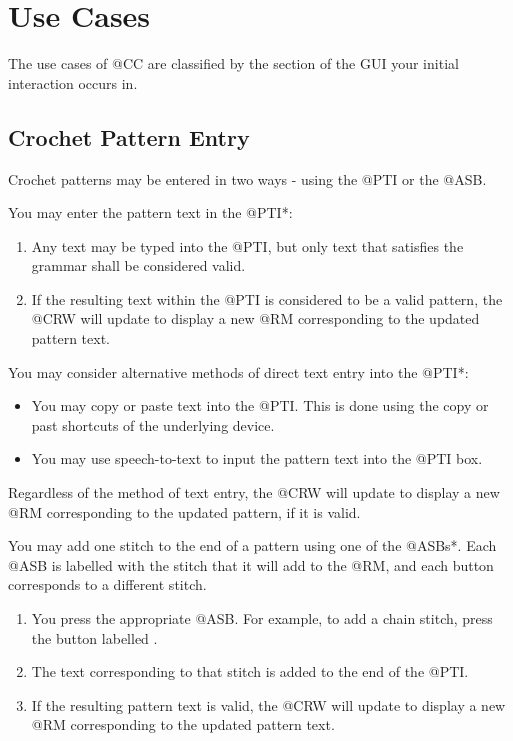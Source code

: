 \documentclass[main.tex]{subfiles}
\begin{document}
\chapter{Use Cases}\label{chp:use}

The use cases of @CC are classified by the section of the GUI your initial interaction occurs in.

\section{Crochet Pattern Entry}

Crochet patterns may be entered in two ways - using the @PTI or the @ASB.

You may enter the pattern text in the @PTI*:
\begin{enumerate}
\item Any text may be typed into the @PTI, but only text that satisfies the grammar shall be considered valid.
\item If the resulting text within the @PTI is considered to be a valid pattern, the @CRW will update to display a new @RM corresponding to the updated pattern text. 
\end{enumerate}

You may consider alternative methods of direct text entry into the @PTI*:
\begin{itemize}
\item You may copy or paste text into the @PTI. This is done using the copy or past shortcuts of the underlying device.
\item You may use speech-to-text to input the pattern text into the @PTI box.
\end{itemize}
Regardless of the method of text entry, the @CRW will update to display a new @RM corresponding to the updated pattern, if it is valid.


You may add one stitch to the end of a pattern using one of the @ASBs*. Each @ASB is labelled with the stitch that it will add to the @RM, and each button corresponds to a different stitch. 

\begin{enumerate}
\item You press the appropriate @ASB. For example, to add a chain stitch, press the button labelled .
\item The text corresponding to that stitch is added to the end of the @PTI.
\item If the resulting pattern text is valid, the @CRW will update to display a new @RM corresponding to the updated pattern text. 
\end{enumerate}
\end{document}

